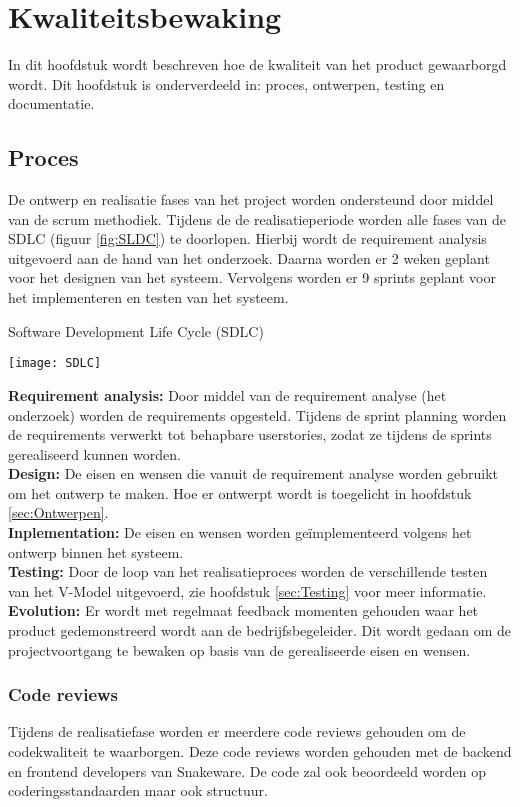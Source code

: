 \chapter{Kwaliteitsbewaking}
In dit hoofdstuk wordt beschreven hoe de kwaliteit van het product gewaarborgd wordt.
Dit hoofdstuk is onderverdeeld in: proces, ontwerpen, testing en documentatie.
\section{Proces}
De ontwerp en realisatie fases van het project worden ondersteund door middel van de scrum methodiek.
\whitespace
Tijdens de de realisatieperiode worden alle fases van de SDLC (figuur \ref{fig:SLDC}) te doorlopen.
Hierbij wordt de requirement analysis uitgevoerd aan de hand van het onderzoek.
Daarna worden er 2 weken geplant voor het designen van het systeem.
Vervolgens worden er 9 sprints geplant voor het implementeren en testen van het systeem. \\
\begin{graphic}
    \captionsetup{type=figure}
    \caption{Software Development Life Cycle (SDLC)}
    \texttt{[image: SDLC]}
    \label{fig:SLDC}
\end{graphic}
\textbf{Requirement analysis:} Door middel van de requirement analyse (het onderzoek) worden de requirements opgesteld.
Tijdens de sprint planning worden de requirements verwerkt tot behapbare userstories, zodat ze tijdens de sprints gerealiseerd kunnen worden. \\
\textbf{Design:} De eisen en wensen die vanuit de requirement analyse worden gebruikt om het ontwerp te maken.
Hoe er ontwerpt wordt is toegelicht in hoofdstuk \ref{sec:Ontwerpen}.\\
\textbf{Inplementation:}
De eisen en wensen worden geïmplementeerd volgens het ontwerp binnen het systeem.\\
\textbf{Testing:} Door de loop van het realisatieproces worden de verschillende testen van het V-Model uitgevoerd, zie hoofdstuk \ref{sec:Testing} voor meer informatie.\\
\textbf{Evolution:} Er wordt met regelmaat feedback momenten gehouden waar het product gedemonstreerd wordt aan de bedrijfsbegeleider.
Dit wordt gedaan om de projectvoortgang te bewaken op basis van de gerealiseerde eisen en wensen.
\subsection{Code reviews}
Tijdens de realisatiefase worden er meerdere code reviews gehouden om de codekwaliteit te waarborgen.
Deze code reviews worden gehouden met de backend en frontend developers van Snakeware.
De code zal ook beoordeeld worden op coderingsstandaarden maar ook structuur.
